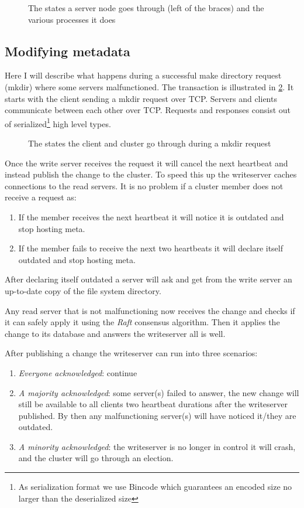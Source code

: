 \begin{figure}[htbp]
	\centering
	
	\caption{The states a server node goes through (left of the braces) and the various processes it does}
	\label{fig:nodelife}
\end{figure}

\subsection{Modifying metadata}
Here I will describe what happens during a successful make directory request (mkdir) where some servers malfunctioned. The transaction is illustrated in \cref{fig:mkdir}. It starts with the client sending a mkdir request over TCP. Servers and clients communicate between each other over TCP. Requests and responses consist out of serialized\footnote{As serialization format we use Bincode which guarantees an encoded size no larger than the deserialized size} high level types. 

\begin{figure}[htbp]
	\centering
	
	\caption{The states the client and cluster go through during a mkdir request}
	\label{fig:mkdir}
\end{figure}

Once the write server receives the request it will cancel the next heartbeat and instead publish the change to the cluster. To speed this up the writeserver caches connections to the read servers. It is no problem if a cluster member does not receive a request as:
\begin{enumerate}
	\item If the member receives the next heartbeat it will notice it is outdated and stop hosting meta. 
	\item If the member fails to receive the next two heartbeats it will declare itself outdated and stop hosting meta.
\end{enumerate}
After declaring itself outdated a server will ask and get from the write server an up-to-date copy of the file system directory. 

Any read server that is not malfunctioning now receives the change and checks if it can safely apply it using the \textit{Raft} consensus algorithm. Then it applies the change to its database and answers the writeserver all is well.

After publishing a change the writeserver can run into three scenarios:
\begin{enumerate}
	\item \textit{Everyone acknowledged}: continue
	\item \textit{A majority acknowledged}: some server(s) failed to answer, the new change will still be available to all clients two heartbeat durations after the writeserver published. By then any malfunctioning server(s) will have noticed it/they are outdated.
	\item \textit{A minority acknowledged}: the writeserver is no longer in control it will crash, and the cluster will go through an election.
\end{enumerate}

